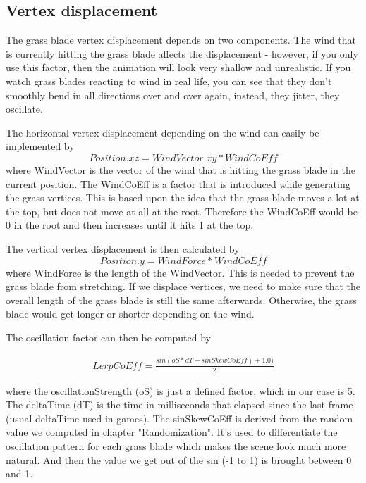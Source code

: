\documentclass[conference]{acmsiggraph}
\begin{document}
\subsection{Vertex displacement}
The grass blade vertex displacement depends on two components. The wind that is currently hitting the grass blade affects the displacement - however, if you only use this factor, then the animation will look very shallow and unrealistic. If you watch grass blades reacting to wind in real life, you can see that they don't smoothly bend in all directions over and over again, instead, they jitter, they oscillate.

The horizontal vertex displacement depending on the wind can easily be implemented by
\begin{equation}
Position.xz = WindVector.xy * WindCoEff
\end{equation}
where WindVector is the vector of the wind that is hitting the grass blade in the current position. The WindCoEff is a factor that is introduced while generating the grass vertices. This is based upon the idea that the grass blade moves a lot at the top, but does not move at all at the root. Therefore the WindCoEff would be 0 in the root and then increases until it hits 1 at the top.

The vertical vertex displacement is then calculated by
\begin{equation}
Position.y = WindForce * WindCoEff
\end{equation}
where WindForce is the length of the WindVector. This is needed to prevent the grass blade from stretching. If we displace vertices, we need to make sure that the overall length of the grass blade is still the same afterwards. Otherwise, the grass blade would get longer or shorter depending on the wind.

The oscillation factor can then be computed by
\begin{center}
\begin{align*}
LerpCoEff = \frac{sin(oS * dT + sinSkewCoEff) + 1.0)}{2}
\end{align*}
\end{center}
where the oscillationStrength (oS) is just a defined factor, which in our case is 5. The deltaTime (dT) is the time in milliseconds that elapsed since the last frame (usual deltaTime used in games). The sinSkewCoEff is derived from the random value we computed in chapter "Randomization". It's used to differentiate the oscillation pattern for each grass blade which makes the scene look much more natural. And then the value we get out of the sin (-1 to 1) is brought between 0 and 1.
\end{document}
